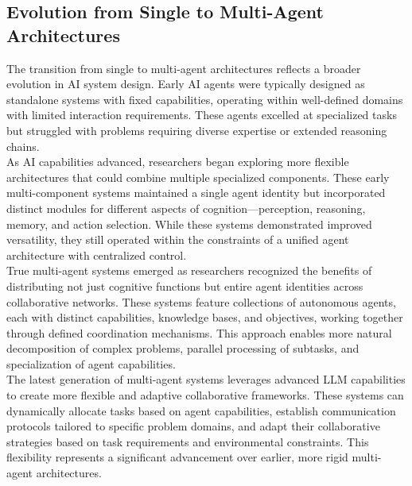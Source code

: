 \subsection{Evolution from Single to Multi-Agent Architectures}
The transition from single to multi-agent architectures reflects a broader evolution in AI system design. Early AI agents were typically designed as standalone systems with fixed capabilities, operating within well-defined domains with limited interaction requirements. These agents excelled at specialized tasks but struggled with problems requiring diverse expertise or extended reasoning chains.\\ \newline
As AI capabilities advanced, researchers began exploring more flexible architectures that could combine multiple specialized components. These early multi-component systems maintained a single agent identity but incorporated distinct modules for different aspects of cognition—perception, reasoning, memory, and action selection. While these systems demonstrated improved versatility, they still operated within the constraints of a unified agent architecture with centralized control.\\ \newline
True multi-agent systems emerged as researchers recognized the benefits of distributing not just cognitive functions but entire agent identities across collaborative networks. These systems feature collections of autonomous agents, each with distinct capabilities, knowledge bases, and objectives, working together through defined coordination mechanisms. This approach enables more natural decomposition of complex problems, parallel processing of subtasks, and specialization of agent capabilities.\\ \newline
The latest generation of multi-agent systems leverages advanced LLM capabilities to create more flexible and adaptive collaborative frameworks. These systems can dynamically allocate tasks based on agent capabilities, establish communication protocols tailored to specific problem domains, and adapt their collaborative strategies based on task requirements and environmental constraints. This flexibility represents a significant advancement over earlier, more rigid multi-agent architectures.\\

